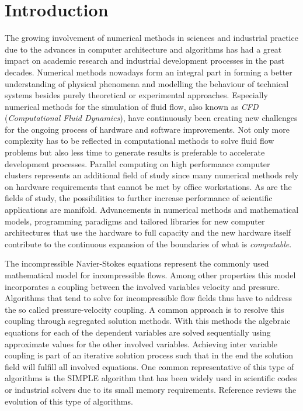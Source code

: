 \section{Introduction}

The growing involvement of numerical methods in sciences and industrial practice due to the advances in computer architecture and algorithms has had a great impact on academic research and industrial development processes in the past decades. Numerical methods nowadays form an integral part in forming a better understanding of physical phenomena and modelling the behaviour of technical systems besides purely theoretical or experimental approaches. Especially numerical methods for the simulation of fluid flow, also known as \emph{CFD} (\emph{Computational Fluid Dynamics}), have continuously been creating new challenges for the ongoing process of hardware and software improvements. Not only more complexity has to be reflected in computational methods to solve fluid flow problems but also less time to generate results is preferable to accelerate development processes. Parallel computing on high performance computer clusters represents an additional field of study since many numerical methods rely on hardware requirements that cannot be met by office workstations. As are the fields of study, the possibilities to further increase performance of scientific applications are manifold. Advancements in numerical methods and mathematical models, programming paradigms and tailored libraries for new computer architectures that use the hardware to full capacity and the new hardware itself contribute to the continuous expansion of the boundaries of what is \emph{computable}.

The incompressible Navier-Stokes equations represent the commonly used mathematical model for incompressible flows. Among other properties this model incorporates a coupling between the involved variables velocity and pressure. Algorithms that tend to solve for incompressible flow fields thus have to address the so called pressure-velocity coupling. A common approach is to resolve this coupling through segregated solution methods. With this methods the algebraic equations for each of the dependent variables are solved sequentially using approximate values for the other involved variables. Achieving inter variable coupling is part of an iterative solution process such that in the end the solution field will fulfill all involved equations. One common representative of this type of algorithms is the SIMPLE algorithm that has been widely used in scientific codes or industrial solvers due to its small memory requirements. Reference \cite{acharya07} reviews the evolution of this type of algorithms.

